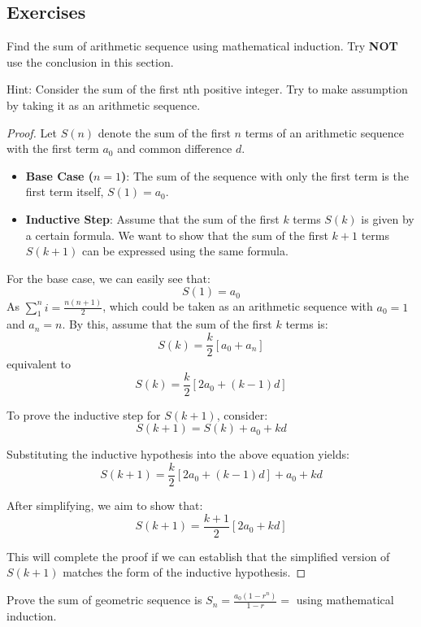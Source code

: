 \subsection{Exercises}
\begin{exercise}
    Find the sum of arithmetic sequence using mathematical induction. Try \textbf{NOT} use the conclusion in this section.
\end{exercise}
Hint: Consider the sum of the first nth positive integer. Try to make assumption by taking it as an arithmetic sequence.
\begin{proof}
    Let \( S(n) \) denote the sum of the first \( n \) terms of an arithmetic sequence with the first term \( a_0 \) and common difference \( d \).
    \begin{itemize}
        \item \textbf{Base Case (\( n = 1 \))}: The sum of the sequence with only the first term is the first term itself, \( S(1) = a_0 \).
        \item \textbf{Inductive Step}: Assume that the sum of the first \( k \) terms \( S(k) \) is given by a certain formula. We want to show that the sum of the first \( k+1 \) terms \( S(k+1) \) can be expressed using the same formula.
        \end{itemize}
        
        For the base case, we can easily see that:
        \[
        S(1) = a_0
        \]
        As $\sum_{1}^{n}i = \frac{n(n+1)}{2}$, which could be taken as an arithmetic sequence with $a_0=1$ and
        $a_n=n$.
        By this, assume that the sum of the first \( k \) terms is:
        \[
        S(k) = \frac{k}{2} [a_0 + a_n]
        \]
        equivalent to
        \[
        S(k) = \frac{k}{2} [2a_0 + (k-1)d]
        \]
        
        To prove the inductive step for \( S(k+1) \), consider:
        \[
        S(k+1) = S(k) + a_0 + kd
        \]
        
        Substituting the inductive hypothesis into the above equation yields:
        \[
        S(k+1) = \frac{k}{2} [2a_0 + (k-1)d] + a_0 + kd
        \]
        
        After simplifying, we aim to show that:
        \[
        S(k+1) = \frac{k+1}{2} [2a_0 + kd]
        \]
        
        This will complete the proof if we can establish that the simplified version of \( S(k+1) \) matches the form of the inductive hypothesis.
\end{proof}
\begin{exercise}
    Prove the sum of geometric sequence  is \( S_n = \frac{a_0(1 - r^n)}{1 - r} = \) using mathematical induction.
\end{exercise}
